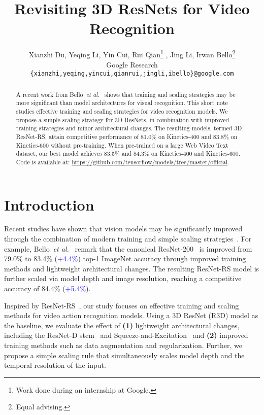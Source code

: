 \documentclass{article} \usepackage{iclr2021_conference,times}
\title{Revisiting 3D ResNets for Video Recognition}
\author{Xianzhi Du, Yeqing Li, Yin Cui, Rui Qian\thanks{Work done during an internship at Google.} , Jing Li\footnotemark[2], Irwan Bello\thanks{Equal advising.} \\
Google Research \\
\small{\texttt{\{xianzhi,yeqing,yincui,qianrui,jingli,ibello\}@google.com}} \\
}
\newcommand{\etal}{\textit{et al.}}
\begin{document}
\maketitle
\begin{abstract}

A recent work from Bello~\etal~\cite{bello2021revisiting} shows that training and scaling strategies may be more significant than model architectures for visual recognition.
This short note studies effective training and scaling strategies for video recognition models.
We propose a simple scaling strategy for 3D ResNets, in combination with improved training strategies and minor architectural changes.
The resulting models, termed 3D ResNet-RS, attain competitive performance of 81.0\% on Kinetics-400 and 83.8\% on Kinetics-600 without pre-training.
When pre-trained on a large Web Video Text dataset, our best model achieves 83.5\% and 84.3\% on Kinetics-400 and Kinetics-600. 
Code is available at: \small{\url{https://github.com/tensorflow/models/tree/master/official}}.

\end{abstract}

\section{Introduction}
Recent studies have shown that vision models may be significantly improved through the combination of modern training and simple scaling strategies~\cite{bello2021revisiting, Du2021SimpleTS, Kolesnikov2020BigT}.
For example, Bello~\etal~\cite{bello2021revisiting} remark that the canonical ResNet-200~\cite{He2016ResNet} is improved from 79.0\% to 83.4\% (\textcolor{blue}{+4.4\%}) top-1 ImageNet accuracy through improved training methods and lightweight architectural changes.
The resulting ResNet-RS model is further scaled via model depth and image resolution, reaching a competitive accuracy of 84.4\% (\textcolor{blue}{+5.4\%}).

Inspired by ResNet-RS~\cite{bello2021revisiting}, our study focuses on effective training and scaling methods for video action recognition models. 
Using a 3D ResNet (R3D) model as the baseline, we evaluate the effect of \textbf{(1)} lightweight architectural changes, including the ResNet-D stem~\cite{He2019BagOT} and Squeeze-and-Excitation~\cite{Hu2018SqueezeandExcitationN} and \textbf{(2)} improved training methods such as data augmentation and regularization.
Further, we propose a simple scaling rule that simultaneously scales model depth and the temporal resolution of the input.
\end{document}
